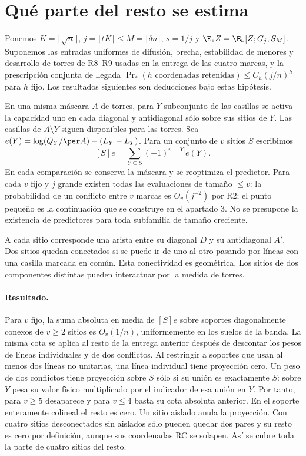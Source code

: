 \section{Qué parte del resto se estima}
Ponemos $K=\lceil\sqrt n\rceil$, $j=\lceil tK\rceil\le M=\lceil\delta n\rceil$,
$s=1/j$ y $\E_* Z=\E_{\bar\nu}[Z;G_j,S_M]$. Suponemos las entradas uniformes
de difusión, brecha, estabilidad de menores y desarrollo de torres de R8--R9
usadas en la entrega de las cuatro marcas, y la prescripción conjunta de llegada
$\Pr_*(h\text{ coordenadas retenidas})\le C_h(j/n)^h$ para $h$ fijo.
Los resultados siguientes son deducciones bajo estas hipótesis.

En una misma máscara $A$ de torres, para $Y$ subconjunto de las casillas se activa
la capacidad uno en cada diagonal y antidiagonal sólo sobre sus sitios de $Y$.
Las casillas de $A\setminus Y$ siguen disponibles para las torres. Sea
$e(Y)=\log(Q_Y/\per A)-(L_Y-L_T)$. Para un conjunto de $v$ sitios $S$ escribimos
\[
 [S]e=\sum_{Y\subseteq S}(-1)^{v-|Y|} e(Y).
\]
En cada comparación se conserva la máscara y se reoptimiza el predictor.
Para cada $v$ fijo y $j$ grande existen todas las evaluaciones de tamaño $\le v$:
la probabilidad de un conflicto entre $v$ marcas es $O_v(j^{-2})$ por R2;
el punto pequeño es la continuación que se construye en el apartado 3.
No se presupone la existencia de predictores para toda subfamilia de tamaño creciente.

A cada sitio corresponde una arista entre su diagonal $D$ y su antidiagonal $A'$.
Dos sitios quedan conectados si se puede ir de uno al otro pasando por líneas
con una casilla marcada en común. Esta conectividad es geométrica. Los sitios de
dos componentes distintas pueden interactuar por la medida de torres.
\paragraph{Resultado.}
Para $v$ fijo, la suma absoluta en media de $[S]e$ sobre soportes diagonalmente
conexos de $v\ge2$ sitios es $O_v(1/n)$, uniformemente en los suelos de la banda.
La misma cota se aplica al resto de la entrega anterior después de descontar los
pesos de líneas individuales y de dos conflictos. Al restringir a soportes que usan
al menos dos líneas no unitarias, una línea individual tiene proyección cero.
Un peso de dos conflictos tiene proyección sobre $S$ sólo si su unión es exactamente
$S$: sobre $Y$ pesa su valor físico multiplicado por el indicador de esa unión en $Y$.
Por tanto, para $v\ge5$ desaparece y para $v\le4$ basta su cota absoluta anterior.
En el soporte enteramente colineal el resto es cero. Un sitio aislado anula la
proyección. Con cuatro sitios desconectados sin aislados sólo pueden quedar dos pares
y su resto es cero por definición, aunque sus coordenadas RC se solapen.
Así se cubre toda la parte de cuatro sitios del resto.
